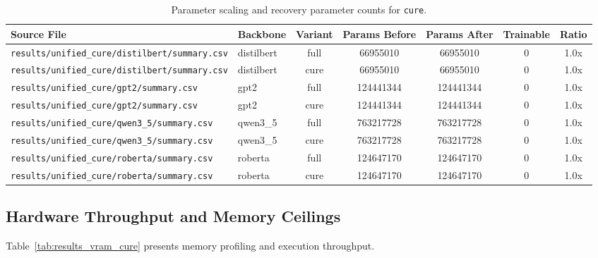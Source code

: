 \begin{table}[t]
\centering
\small
\begin{tabular}{llccccc}
\toprule
\textbf{Source File} & \textbf{Backbone} & \textbf{Variant} & \textbf{Params Before} & \textbf{Params After} & \textbf{Trainable} & \textbf{Ratio} \\
\midrule
\texttt{results/unified\_cure/distilbert/summary.csv} & distilbert & full & 66955010 & 66955010 & 0 & 1.0x \\
\texttt{results/unified\_cure/distilbert/summary.csv} & distilbert & cure & 66955010 & 66955010 & 0 & 1.0x \\
\texttt{results/unified\_cure/gpt2/summary.csv} & gpt2 & full & 124441344 & 124441344 & 0 & 1.0x \\
\texttt{results/unified\_cure/gpt2/summary.csv} & gpt2 & cure & 124441344 & 124441344 & 0 & 1.0x \\
\texttt{results/unified\_cure/qwen3\_5/summary.csv} & qwen3\_5 & full & 763217728 & 763217728 & 0 & 1.0x \\
\texttt{results/unified\_cure/qwen3\_5/summary.csv} & qwen3\_5 & cure & 763217728 & 763217728 & 0 & 1.0x \\
\texttt{results/unified\_cure/roberta/summary.csv} & roberta & full & 124647170 & 124647170 & 0 & 1.0x \\
\texttt{results/unified\_cure/roberta/summary.csv} & roberta & cure & 124647170 & 124647170 & 0 & 1.0x \\
\bottomrule
\end{tabular}
\caption{Parameter scaling and recovery parameter counts for \texttt{cure}.}
\label{tab:results_params_cure}
\end{table}

\subsection{Hardware Throughput and Memory Ceilings}
Table~\ref{tab:results_vram_cure} presents memory profiling and execution throughput.

